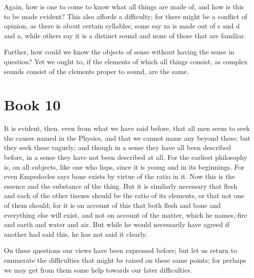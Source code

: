 \documentclass[oneside, 17pt, dvipsnames]{extbook}
\begin{document}
Again, how is one to come to know what all things are made of, and how is this to be made evident? This also affords a difficulty; for there might be a conflict of opinion, as there is about certain syllables; some say za is made out of s and d and a, while others say it is a distinct sound and none of those that are familiar.

Further, how could we know the objects of sense without having the sense in question? Yet we ought to, if the elements of which all things consist, as complex sounds consist of the clements proper to sound, are the same.




\newpage
\section{Book 10}

It is evident, then, even from what we have said before, that all men seem to seek the causes named in the Physics, and that we cannot name any beyond these; but they seek these vaguely; and though in a sense they have all been described before, in a sense they have not been described at all. For the earliest philosophy is, on all subjects, like one who lisps, since it is young and in its beginnings. For even Empedocles says bone exists by virtue of the ratio in it. Now this is the essence and the substance of the thing. But it is similarly necessary that flesh and each of the other tissues should be the ratio of its elements, or that not one of them should; for it is on account of this that both flesh and bone and everything else will exist, and not on account of the matter, which he names,-fire and earth and water and air. But while he would necessarily have agreed if another had said this, he has not said it clearly.

On these questions our views have been expressed before; but let us return to enumerate the difficulties that might be raised on these same points; for perhaps we may get from them some help towards our later difficulties.
\end{document}
